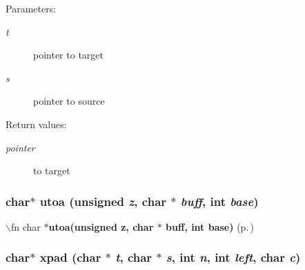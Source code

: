 \begin{Desc}
\item[Parameters: ]\par
\begin{description}
\item[{\em 
t}]pointer to target \item[{\em 
s}]pointer to source \end{description}
\end{Desc}
\begin{Desc}
\item[Return values: ]\par
\begin{description}
\item[{\em 
pointer}]to target \end{description}
\end{Desc}
\subsubsection{\setlength{\rightskip}{0pt plus 5cm}char$\ast$ utoa (unsigned {\em z}, char $\ast$ {\em buff}, int {\em base})}\label{hpstring_8h_a9}


$\backslash$fn char $\ast${\bf utoa(unsigned z, char $\ast$ buff, int base)} {\rm (p.\,\pageref{hpstring_8h_a9})}

\subsubsection{\setlength{\rightskip}{0pt plus 5cm}char$\ast$ xpad (char $\ast$ {\em t}, char $\ast$ {\em s}, int {\em n}, int {\em left}, char {\em c})}\label{hpstring_8h_a15}


